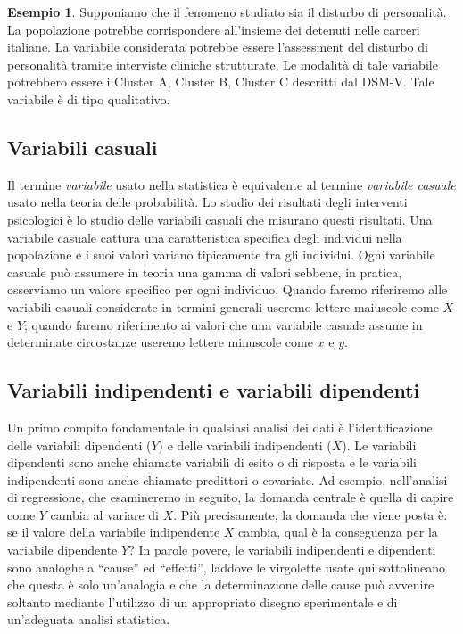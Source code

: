\documentclass[
]{book}
\theoremstyle{definition}
\theoremstyle{definition}
\newtheorem{example}{Esempio}
\theoremstyle{definition}
\theoremstyle{definition}
\theoremstyle{remark}
\begin{document}
\begin{example}
Supponiamo che il fenomeno studiato sia il disturbo di personalità. La popolazione potrebbe corrispondere all'insieme dei detenuti nelle carceri italiane. La variabile considerata potrebbe essere l'assessment del disturbo di personalità tramite interviste cliniche strutturate. Le modalità di tale variabile potrebbero essere i Cluster A, Cluster B, Cluster C descritti dal DSM-V. Tale variabile è di tipo qualitativo.
\end{example}

\hypertarget{variabili-casuali}{%
\subsection{Variabili casuali}\label{variabili-casuali}}

Il termine \emph{variabile} usato nella statistica è equivalente al termine \emph{variabile casuale} usato nella teoria delle probabilità. Lo studio dei risultati degli interventi psicologici è lo studio delle variabili casuali che misurano questi risultati. Una variabile casuale cattura una caratteristica specifica degli individui nella popolazione e i suoi valori variano tipicamente tra gli individui. Ogni variabile casuale può assumere in teoria una gamma di valori sebbene, in pratica, osserviamo un valore specifico per ogni individuo. Quando faremo riferiremo alle variabili casuali considerate in termini generali useremo lettere maiuscole come \(X\) e \(Y\); quando faremo riferimento ai valori che una variabile casuale assume in determinate circostanze useremo lettere minuscole come \(x\) e \(y\).

\hypertarget{variabili-indipendenti-e-variabili-dipendenti}{%
\subsection{Variabili indipendenti e variabili dipendenti}\label{variabili-indipendenti-e-variabili-dipendenti}}

Un primo compito fondamentale in qualsiasi analisi dei dati è l'identificazione delle variabili dipendenti (\(Y\)) e delle variabili indipendenti (\(X\)). Le variabili dipendenti sono anche chiamate variabili di esito o di risposta e le variabili indipendenti sono anche chiamate predittori o covariate. Ad esempio, nell'analisi di regressione, che esamineremo in seguito, la domanda centrale è quella di capire come \(Y\) cambia al variare di \(X\). Più precisamente, la domanda che viene posta è: se il valore della variabile indipendente \(X\) cambia, qual è la conseguenza per la variabile dipendente \(Y\)? In parole povere, le variabili indipendenti e dipendenti sono analoghe a ``cause'' ed ``effetti'', laddove le virgolette usate qui sottolineano che questa è solo un'analogia e che la determinazione delle cause può avvenire soltanto mediante l'utilizzo di un appropriato disegno sperimentale e di un'adeguata analisi statistica.
\end{document}
